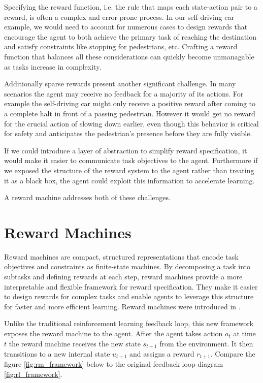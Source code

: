 \documentclass[12pt, a4paper]{article}
\begin{document}
Specifying the reward function, i.e. the rule that maps each state-action pair to a reward, is often a complex and error-prone process. In our self-driving car example, we would need to account for numerous cases to design rewards that encourage the agent to both achieve the primary task of reaching the destination and satisfy constraints like stopping for pedestrians, etc. Crafting a reward function that balances all these considerations can quickly become unmanagable as tasks increase in complexity.

Additionally sparse rewards present another significant challenge. In many scenarios the agent may receive no feedback for a majority of its actions. For example the self-driving car might only receive a positive reward after coming to a complete halt in front of a passing pedestrian. However it would get no reward for the crucial action of slowing down earlier, even though this behavior is critical for safety and anticipates the pedestrian's presence before they are fully visible.

If we could introduce a layer of abstraction to simplify reward specification, it would make it easier to communicate task objectives to the agent. Furthermore if we exposed the structure of the reward system to the agent rather than treating it as a black box, the agent could exploit this information to accelerate learning.

A reward machine addresses both of these challenges.


\section*{Reward Machines}

Reward machines are compact, structured representations that encode task objectives and constraints as finite-state machines. By decomposing a task into subtasks and defining rewards at each step, reward machines provide a more interpretable and flexible framework for reward specification. They make it easier to design rewards for complex tasks and enable agents to leverage this structure for faster and more efficient learning. Reward machines were introduced in \cite{RM2018}.

Unlike the traditional reinforcement learning feedback loop, this new framework exposes the reward machine to the agent. After the agent takes action $a_t$ at time $t$ the reward machine receives the new state $s_{t+1}$ from the environment. It then transitions to a new internal state $u_{t+1}$ and assigns a reward $r_{t+1}$. Compare the figure \ref{fig:rm_framework} below to the original feedback loop diagram \ref{fig:rl_framework}.
\end{document}
